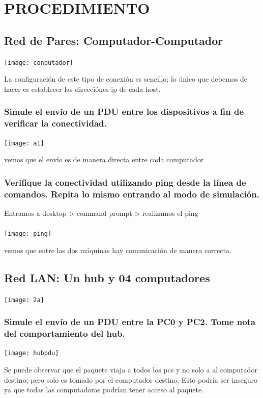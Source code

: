 \chapter{PROCEDIMIENTO}

\section{Red de Pares: Computador-Computador}

\begin{caja}[]{
 \texttt{[image: conputador]} }
 \end{caja}
 
\begin{definicion}[]{
La configuraci\'on de este tipo de conexi\'on es sencillo; lo \'unico que debemos de hacer es establecer las direcci\'ones ip de cada host.}
\end{definicion}


\subsection{Simule el env\'io de un PDU entre los dispositivos a fin de verificar la conectividad.}
\texttt{[image: a1]}
\begin{definicion}[]{
 vemos que el env\'io es de manera directa entre cada computador
}
\end{definicion}

\subsection{Verifique la conectividad utilizando ping desde la l\'inea de comandos. Repita lo mismo entrando al modo de simulaci\'on.}
Entramos a desktop > command prompt > realizamos el ping
\\
\\
\texttt{[image: ping]}
\begin{definicion}[]
{
 vemos que entre las dos m\'aquinas hay comunicaci\'on de manera correcta.
}
\end{definicion}

\section{Red LAN: Un hub y 04 computadores}
\begin{caja}[]{
 \texttt{[image: 2a]} }
 \end{caja}
 
 
 \subsection{Simule el env\'io de un PDU entre la PC0 y PC2. Tome nota del comportamiento del hub.}
 \texttt{[image: hubpdu]}
\begin{definicion}[]
{
 Se puede observar que el paquete viaja a todos los pcs y no solo a al computador destino; pero solo es tomado por el computador destino. Esto podr\'ia ser inseguro ya que todas las computadoras podr\'ian tener acceso al paquete.
}
\end{definicion}


